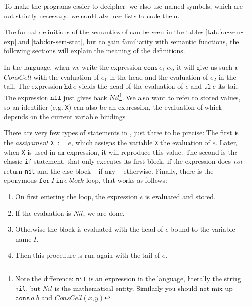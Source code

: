 To make the programs easier to decipher, we also use named symbols, which are
not strictly necessary: we could also use lists to code them.

The formal definitions of the semantics of \FOR can be seen in the tables 
\ref{tab:for-sem-exp} and \ref{tab:for-sem-stat}, but to gain familiarity 
with semantic functions, the following sections will explain the meaning of 
the definitions.

In the \FOR language, when we write the expression $\mathtt{cons}\: e_1\: e_2$, it
will give us such a $ConsCell$ with the evaluation of $e_1$ in the head and the
evaluation of $e_2$ in the tail. The expression $\mathtt{hd}\: e$ yields the head of
the evaluation of $e$ and $\mathtt{tl}\: e$ its tail. The expression 
$\mathtt{nil}$ just gives back $Nil$\footnote{
	Note the difference: $\mathtt{nil}$ is an expression in the language,
	literally the string {\tt nil}, but $Nil $ is the mathematical entity.
	Similarly you should not mix up $\mathtt{cons}\: a\: b$ and $ConsCell(x, y)$}.
We also want to refer to stored values, so an identifier (e.g. {\tt X}) can
also be an expression, the evaluation of which depends on the current variable
bindings.

There are very few types of statements in \FOR, just three to be precise: The 
first is the \emph{assignment} $\mathtt{X}\:\mathtt{:=}\: e$, which assigns the variable {\tt X}
the evaluation of $e$. Later, when {\tt X} is used in an expression, it 
will reproduce this value. The second is the classic {\tt if} statement, that 
only executes its first block, if the expression does \emph{not} return {\tt nil} 
and the else-block -- if any -- otherwise. Finally, there is the eponymous 
$\mathtt{for}\: I\: \mathtt{in}\: e\: block$ loop, that works as follows:

\begin{enumerate}
	\item On first entering the loop, the expression $e$ is evaluated and stored.
	\item If the evaluation is $Nil$, we are done.
	\item Otherwise the block is evaluated with the head of $e$ bound to the 
		variable name $I$.
	\item Then this procedure is run again with the tail of $e$.
\end{enumerate}

